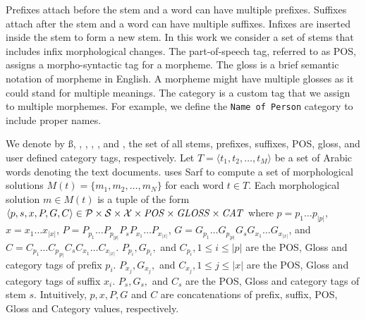 Prefixes attach before the stem and a word can have multiple prefixes. 
Suffixes attach after the stem and a word can have multiple suffixes. 
Infixes are inserted inside the stem to form a new stem. 
In this work we consider a set of stems that includes infix morphological changes. 
The part-of-speech tag, referred to as POS, 
assigns a morpho-syntactic tag for a morpheme. 
The gloss is a brief semantic notation of morpheme in English. 
A morpheme might have multiple glosses as it could stand for multiple meanings. 
The category is a custom tag that we assign to multiple morphemes. 
For example, we define the {\tt Name of Person} category to include proper names.

We denote by 
\ss,
\pp,
\xx,
\PP,
\GG, and 
\AC, the set of 
all stems,
prefixes,
suffixes,
POS,
gloss, 
and user defined category tags, respectively.
Let $T=\langle t_1,t_2,\ldots,t_M\rangle$ be a set of Arabic words denoting the 
text documents.
\framework uses Sarf to compute a set of morphological solutions $M(t)=\{m_1,m_2,\ldots,m_N\}$
for each word $t\in T$. 
%
Each morphological solution $m\in M(t)$ is a tuple of the form 
$\langle p,s,x,P,G,C\rangle \in {\cal P} \times {\cal S} \times {\cal X} \times \mathit{POS} \times \mathit{GLOSS} \times \mathit{CAT}$ 
where $p=p_1 \ldots p_{|p|}$, $x=x_1 \ldots x_{|x|}$, 
$P=P_{p_1}\ldots P_{p_{|p|}} P_s P_{x_1}\ldots P_{x_{|x|}}$,
$G=G_{p_1}\ldots G_{p_{|p|}} G_s G_{x_1}\ldots G_{x_{|x|}}$, and
$C=C_{p_1} \ldots C_{p_{|p|}} C_s C_{x_1}\ldots C_{x_{|x|}}$. 
$P_{p_i}, G_{p_i},$ and $C_{p_i},1\le i \le |p|$ are the POS, Gloss and 
category tags of prefix $p_i$. 
$P_{x_j}, G_{x_j},$ and $C_{x_j},1\le j \le |x|$ are the POS, Gloss and 
category tags of suffix $x_i$. 
$P_s, G_s,$ and $C_s$ are the POS, Gloss and 
category tags of stem $s$. 
%
Intuitively, 
$p,x,P,G$ and $C$ are concatenations of prefix, suffix, POS, Gloss and
Category values, respectively.

\begin{table}[tb]
  \centering
    \vspace{-1em}
  \caption{\label{tab:samplesolution}Sample solution vector for .}
\end{table}%

